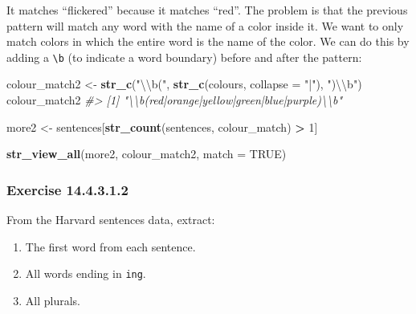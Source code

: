 \documentclass[]{book}
\newenvironment{Shaded}{\begin{snugshade}}{\end{snugshade}}
\newcommand{\CharTok}[1]{\textcolor[rgb]{0.31,0.60,0.02}{#1}}
\newcommand{\CommentTok}[1]{\textcolor[rgb]{0.56,0.35,0.01}{\textit{#1}}}
\newcommand{\DataTypeTok}[1]{\textcolor[rgb]{0.13,0.29,0.53}{#1}}
\newcommand{\DecValTok}[1]{\textcolor[rgb]{0.00,0.00,0.81}{#1}}
\newcommand{\KeywordTok}[1]{\textcolor[rgb]{0.13,0.29,0.53}{\textbf{#1}}}
\newcommand{\NormalTok}[1]{#1}
\newcommand{\OperatorTok}[1]{\textcolor[rgb]{0.81,0.36,0.00}{\textbf{#1}}}
\newcommand{\OtherTok}[1]{\textcolor[rgb]{0.56,0.35,0.01}{#1}}
\newcommand{\StringTok}[1]{\textcolor[rgb]{0.31,0.60,0.02}{#1}}
\providecommand{\tightlist}{%
  \setlength{\itemsep}{0pt}\setlength{\parskip}{0pt}}
\theoremstyle{plain}
\theoremstyle{remark}
\begin{document}
It matches ``flickered'' because it matches ``red''. The problem is that
the previous pattern will match any word with the name of a color inside
it. We want to only match colors in which the entire word is the name of
the color. We can do this by adding a \texttt{\textbackslash{}b} (to
indicate a word boundary) before and after the pattern:

\begin{Shaded}
\begin{Highlighting}[]
\NormalTok{colour_match2 <-}\StringTok{ }\KeywordTok{str_c}\NormalTok{(}\StringTok{"}\CharTok{\textbackslash{}\textbackslash{}}\StringTok{b("}\NormalTok{, }\KeywordTok{str_c}\NormalTok{(colours, }\DataTypeTok{collapse =} \StringTok{"|"}\NormalTok{), }\StringTok{")}\CharTok{\textbackslash{}\textbackslash{}}\StringTok{b"}\NormalTok{)}
\NormalTok{colour_match2}
\CommentTok{#> [1] "\textbackslash{}\textbackslash{}b(red|orange|yellow|green|blue|purple)\textbackslash{}\textbackslash{}b"}
\end{Highlighting}
\end{Shaded}

\begin{Shaded}
\begin{Highlighting}[]
\NormalTok{more2 <-}\StringTok{ }\NormalTok{sentences[}\KeywordTok{str_count}\NormalTok{(sentences, colour_match) }\OperatorTok{>}\StringTok{ }\DecValTok{1}\NormalTok{]}
\end{Highlighting}
\end{Shaded}

\begin{Shaded}
\begin{Highlighting}[]
\KeywordTok{str_view_all}\NormalTok{(more2, colour_match2, }\DataTypeTok{match =} \OtherTok{TRUE}\NormalTok{)}
\end{Highlighting}
\end{Shaded}

\hypertarget{exercise-14.4.3.1.2}{%
\subsubsection*{\texorpdfstring{Exercise
{14.4.3.1.2}}{Exercise 14.4.3.1.2}}\label{exercise-14.4.3.1.2}}

From the Harvard sentences data, extract:

\begin{enumerate}
\def\labelenumi{\arabic{enumi}.}
\tightlist
\item
  The first word from each sentence.
\item
  All words ending in \texttt{ing}.
\item
  All plurals.
\end{enumerate}
\end{document}
